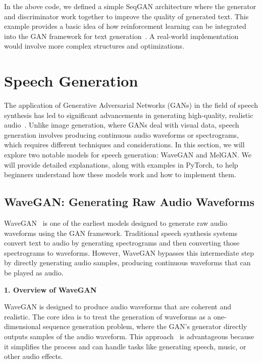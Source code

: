 In the above code, we defined a simple SeqGAN architecture where the generator and discriminator work together to improve the quality of generated text. This example provides a basic idea of how reinforcement learning can be integrated into the GAN framework for text generation~\cite{yu2017seqgan}. A real-world implementation would involve more complex structures and optimizations.



\section{Speech Generation}

The application of Generative Adversarial Networks (GANs) in the field of speech synthesis has led to significant advancements in generating high-quality, realistic audio~\cite{yang2024integrated}. Unlike image generation, where GANs deal with visual data, speech generation involves producing continuous audio waveforms or spectrograms, which requires different techniques and considerations. In this section, we will explore two notable models for speech generation: WaveGAN and MelGAN. We will provide detailed explanations, along with examples in PyTorch, to help beginners understand how these models work and how to implement them.

\subsection{WaveGAN: Generating Raw Audio Waveforms}

WaveGAN~\cite{donahue2018adversarial} is one of the earliest models designed to generate raw audio waveforms using the GAN framework. Traditional speech synthesis systems convert text to audio by generating spectrograms and then converting those spectrograms to waveforms. However, WaveGAN bypasses this intermediate step by directly generating audio samples, producing continuous waveforms that can be played as audio.

\textbf{1. Overview of WaveGAN}

WaveGAN is designed to produce audio waveforms that are coherent and realistic. The core idea is to treat the generation of waveforms as a one-dimensional sequence generation problem, where the GAN's generator directly outputs samples of the audio waveform. This approach~\cite{donahue2018adversarial} is advantageous because it simplifies the process and can handle tasks like generating speech, music, or other audio effects.

